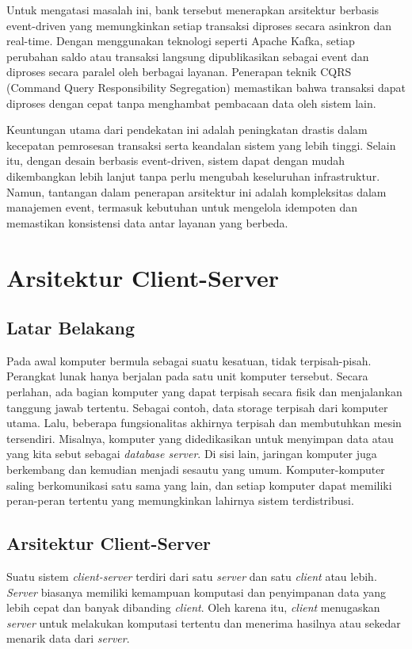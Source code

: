 Untuk mengatasi masalah ini, bank tersebut menerapkan arsitektur berbasis event-driven yang memungkinkan setiap transaksi diproses secara asinkron dan real-time. Dengan menggunakan teknologi seperti Apache Kafka, setiap perubahan saldo atau transaksi langsung dipublikasikan sebagai event dan diproses secara paralel oleh berbagai layanan. Penerapan teknik CQRS (Command Query Responsibility Segregation) memastikan bahwa transaksi dapat diproses dengan cepat tanpa menghambat pembacaan data oleh sistem lain.

Keuntungan utama dari pendekatan ini adalah peningkatan drastis dalam kecepatan pemrosesan transaksi serta keandalan sistem yang lebih tinggi. Selain itu, dengan desain berbasis event-driven, sistem dapat dengan mudah dikembangkan lebih lanjut tanpa perlu mengubah keseluruhan infrastruktur. Namun, tantangan dalam penerapan arsitektur ini adalah kompleksitas dalam manajemen event, termasuk kebutuhan untuk mengelola idempoten dan memastikan konsistensi data antar layanan yang berbeda.


\section{Arsitektur Client-Server}

\subsection{Latar Belakang}
Pada awal komputer bermula sebagai suatu kesatuan, tidak terpisah-pisah. Perangkat lunak hanya berjalan pada satu unit komputer tersebut. Secara perlahan, ada bagian komputer yang dapat terpisah secara fisik dan menjalankan tanggung jawab tertentu. Sebagai contoh, data storage terpisah dari komputer utama. Lalu, beberapa fungsionalitas akhirnya terpisah dan membutuhkan mesin tersendiri. Misalnya, komputer yang didedikasikan untuk menyimpan data atau yang kita sebut sebagai \textit{database server}. Di sisi lain, jaringan komputer juga berkembang dan kemudian menjadi sesautu yang umum. Komputer-komputer saling berkomunikasi satu sama yang lain, dan setiap komputer dapat memiliki peran-peran tertentu yang memungkinkan lahirnya sistem terdistribusi.

\subsection{Arsitektur Client-Server}
Suatu sistem \textit{client-server} terdiri dari satu \textit{server} dan satu \textit{client} atau lebih. \textit{Server} biasanya memiliki kemampuan komputasi dan penyimpanan data yang lebih cepat dan banyak dibanding \textit{client}. Oleh karena itu, \textit{client} menugaskan \textit{server} untuk melakukan komputasi tertentu dan menerima hasilnya atau sekedar menarik data dari \textit{server}.

